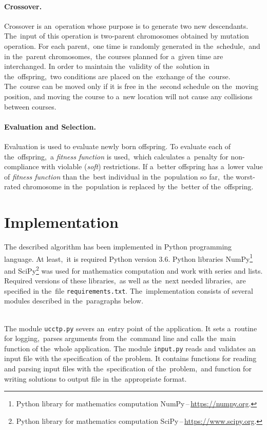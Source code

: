 \paragraph{Crossover.}
Crossover is an~operation whose purpose is to generate two new descendants.
The~input of this operation is two-parent chromosomes obtained by mutation operation.
For each parent,~one time is randomly generated in the~schedule,~and in the~parent chromosomes,~the courses planned for a~given time are interchanged.
In order to maintain the~validity of the~solution in the~offspring,~two conditions are placed on the~exchange of the~course.
The~course can be moved only if it is free in the~second schedule on the~moving position, and moving the course to a~new location will not cause any collisions between courses.

\paragraph{Evaluation and Selection.}
Evaluation is used to evaluate newly born offspring.
To evaluate each of the~offspring,~a \textit{fitness function} is used,~which calculates a~penalty for non-compliance with violable (\textit{soft}) restrictions.
If a~better offspring has a~lower value of \textit{fitness function} than the~best individual in the~population so far,~the worst-rated chromosome in the~population is replaced by the~better of the~offspring.

\section{Implementation} \label{sec:implementation}
The described algorithm has been implemented in Python programming language.
At least,~it is required Python version 3.6.
Python libraries NumPy\footnote{Python library for mathematics computation
NumPy\,--\,\url{https://numpy.org}.} and SciPy\footnote{Python library
for mathematics computation SciPy\,--\,\url{https://www.scipy.org}.} was used for mathematics computation and work with series and lists.
Required versions of these libraries,~as well as the~next needed libraries,~are specified in the~file \texttt{requirements.txt}.
The~implementation consists of several modules described in the~paragraphs below.

\noindent \\
The module \texttt{ucctp.py} severs an~entry point of the application.
It sets a~routine for logging,~parses arguments from the~command line and calls the~main function of the~whole application.
The module \texttt{input.py} reads and validates an input file with the specification of the problem.
It contains functions for reading and parsing input files with the~specification of the~problem,~and function for writing solutions to output file in the~appropriate format.

